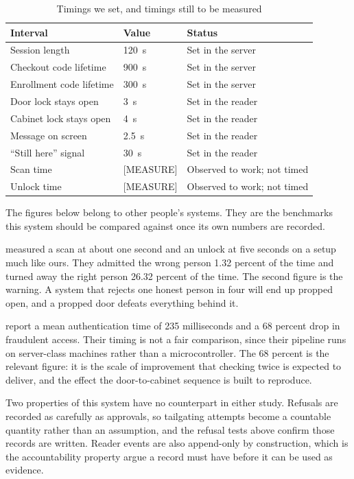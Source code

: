 \begin{table}[H]
\centering
\caption{Timings we set, and timings still to be measured}
\label{tab:timing}
\begin{tabular}{@{}p{42mm}p{26mm}p{42mm}@{}}
\toprule
Interval & Value & Status \\
\midrule
Session length        & 120~s     & Set in the server \\
Checkout code lifetime & 900~s    & Set in the server \\
Enrollment code lifetime & 300~s  & Set in the server \\
Door lock stays open  & 3~s       & Set in the reader \\
Cabinet lock stays open & 4~s     & Set in the reader \\
Message on screen     & 2.5~s     & Set in the reader \\
``Still here'' signal & 30~s      & Set in the reader \\
Scan time             & [MEASURE] & Observed to work; not timed \\
Unlock time           & [MEASURE] & Observed to work; not timed \\
\bottomrule
\end{tabular}
\end{table}


The figures below belong to other people's systems. They are the benchmarks
this system should be compared against once its own numbers are recorded.

\textcite{alsayaydeh2025} measured a scan at about one second and an unlock at
five seconds on a setup much like ours. They admitted the wrong person 1.32
percent of the time and turned away the right person 26.32 percent of the time.
The second figure is the warning. A system that rejects one honest person in
four will end up propped open, and a propped door defeats everything behind it.

\textcite{mohammed2025} report a mean authentication time of 235 milliseconds
and a 68 percent drop in fraudulent access. Their timing is not a fair
comparison, since their pipeline runs on server-class machines rather than a
microcontroller. The 68 percent is the relevant figure: it is the scale of
improvement that checking twice is expected to deliver, and the effect the
door-to-cabinet sequence is built to reproduce.

Two properties of this system have no counterpart in either study. Refusals are
recorded as carefully as approvals, so tailgating attempts become a countable
quantity rather than an assumption, and the refusal tests above confirm those
records are written. Reader events are also append-only by construction, which
is the accountability property \textcite{koisser2023} argue a record must have
before it can be used as evidence.
